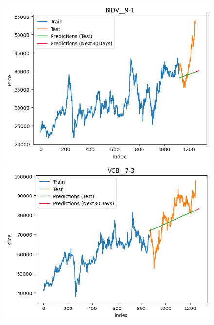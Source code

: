 \begin{figure}[H]
\begin{minipage}{0.15\textwidth}
    \end{minipage}
    \hfill
        \begin{minipage}{0.15\textwidth}
    \centering
    \includegraphics[width=1\textwidth]{resources/chapter-5/result/BIDV_LinearRegression_9-1.png}
    \end{minipage}
    \hfill
    \begin{minipage}{0.15\textwidth}
    \centering
    \includegraphics[width=1\textwidth]{resources/chapter-5/result/VCB_LinearRegression_7-3.png}
    \end{minipage}
    \hfill
    \begin{minipage}{0.15\textwidth}
    \centering

\end{minipage}
\end{figure}
